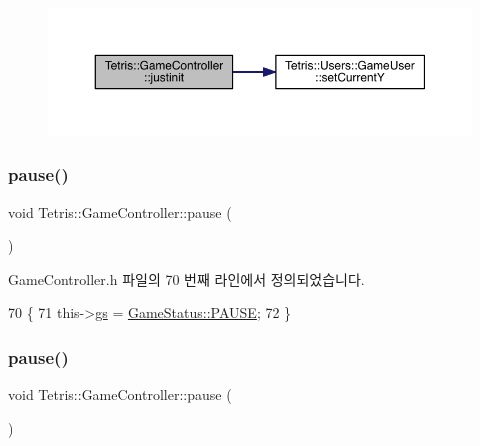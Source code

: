 \nopagebreak
\begin{figure}[H]
\begin{center}
\leavevmode
\includegraphics[width=350pt]{db/dd2/class_tetris_1_1_game_controller_aef406397d4719c9edd49774d0343ce05_cgraph}
\end{center}
\end{figure}
\mbox{\label{class_tetris_1_1_game_controller_a1f55b577248e34b4e0902ce114610edd}} 
\subsubsection{\texorpdfstring{pause()}{pause()}\hspace{0.1cm}{\footnotesize\ttfamily [1/2]}}
{\footnotesize\ttfamily void Tetris\+::\+Game\+Controller\+::pause (\begin{DoxyParamCaption}{ }\end{DoxyParamCaption})\hspace{0.3cm}{\ttfamily [inline]}}



Game\+Controller.\+h 파일의 70 번째 라인에서 정의되었습니다.


\begin{DoxyCode}
70                     \{
71             this->\hyperlink{class_tetris_1_1_game_controller_ae4c894005a82404c73a5a9a6efb208dc}{gs} = \hyperlink{class_tetris_1_1_game_controller_a96a963b56385f3b3a122ff0ca2beb770a291554596c183e837f0a6bec3767c891}{GameStatus::PAUSE};
72         \}
\end{DoxyCode}
\mbox{\label{class_tetris_1_1_game_controller_a1f55b577248e34b4e0902ce114610edd}} 
\subsubsection{\texorpdfstring{pause()}{pause()}\hspace{0.1cm}{\footnotesize\ttfamily [2/2]}}
{\footnotesize\ttfamily void Tetris\+::\+Game\+Controller\+::pause (\begin{DoxyParamCaption}{ }\end{DoxyParamCaption})\hspace{0.3cm}{\ttfamily [inline]}}



